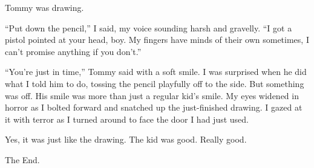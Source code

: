 Tommy was drawing.



``Put down the pencil,'' I said, my voice sounding harsh
and gravelly. ``I got a pistol pointed at your head, boy. My
fingers have minds of their own sometimes, I can't promise
anything if you don't.''



``You're just in time,'' Tommy said with a soft
smile. I was surprised when he did what I told him to do, tossing
the pencil playfully off to the side. But something was off. His
smile was more than just a regular kid's smile. My eyes
widened in horror as I bolted forward and snatched up the
just-finished drawing. I gazed at it with terror as I turned around
to face the door I had just used.



Yes, it was just like the drawing. The kid was good. Really
good.



The End.
 



